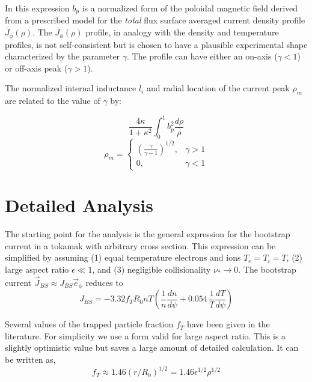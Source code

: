 In this expression $b_p$ is a normalized form of the poloidal magnetic field derived from a prescribed model for the \emph{total} flux surface averaged current density profile $\overline J_\phi(\rho)$. The $\overline J_\phi(\rho)$ profile, in analogy with the density and temperature profiles, is not self-consistent but is chosen to have a plausible experimental shape characterized by the parameter $\gamma$. The profile can have either an on-axis ($\gamma < 1$) or off-axis peak ($\gamma > 1 $).

The normalized internal inductance $l_i$ and radial location of the current peak $\rho_m$ are related to the value of $\gamma$ by:

\begin{equation}
	\frac{ 4 \kappa }{ 1 + \kappa^2 } \int_0^1 b_p^2 \frac{ d\rho}{\rho}
\end{equation}
\begin{equation}
	\rho_m = 
\begin{cases}
   \left( \frac{\gamma}{\gamma - 1} \right)^{1/2},& \gamma > 1 \\
    0,              & \gamma < 1
\end{cases}
\end{equation}

\section{Detailed Analysis}

The starting point for the analysis is the general expression for the bootstrap current in a tokamak with arbitrary cross section.\cite{wesson} This expression can be simplified by assuming (1) equal temperature electrons and ions $T_e = T_i = T$, (2) large aspect ratio $\epsilon \ll 1$, and (3) negligible collisionality $\nu_* \rightarrow 0$. The bootstrap current $\vec J_{BS} \approx J_{BS} \vec e_\phi$ reduces to
\begin{equation}
	J_{BS} = -3.32 f_T R_0 n T \left( \frac{1}{n} \frac{dn}{d\psi} + 0.054 \, \frac{1}{T} \frac{dT}{d\psi} \right)
\end{equation}

Several values of the trapped particle fraction $f_T$ have been given in the literature.\cite{kessel_bootstrap} For simplicity we use a form valid for large aspect ratio. This is a slightly optimistic value but saves a large amount of detailed calculation. It can be written as,
\begin{equation}
	f_T \approx 1.46 ( r / R_0 )^{1/2} = 1.46 \epsilon^{1/2} \rho^{1/2}
\end{equation}

